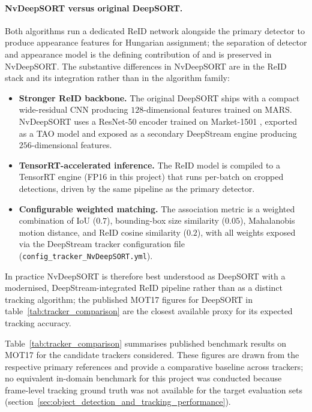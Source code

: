 \paragraph{NvDeepSORT versus original DeepSORT.}
Both algorithms run a dedicated ReID network alongside the primary detector to
produce appearance features for Hungarian assignment; the separation of
detector and appearance model is the defining contribution of
\citet{wojke2017simple} and is preserved in NvDeepSORT. The substantive
differences in NvDeepSORT are in the ReID stack and its integration rather than
in the algorithm family:

\begin{itemize}
	\item \textbf{Stronger ReID backbone.} The original DeepSORT ships with a
	      compact wide-residual CNN producing $128$-dimensional features trained on
	      MARS. NvDeepSORT uses a ResNet-50 encoder trained on Market-1501
	      \citep{nvidia2026reidnet}, exported as a TAO model and exposed as a
	      secondary DeepStream engine producing $256$-dimensional features.
	\item \textbf{TensorRT-accelerated inference.} The ReID model is compiled to
	      a TensorRT engine (FP16 in this project) that runs per-batch on cropped
	      detections, driven by the same pipeline as the primary detector.
	\item \textbf{Configurable weighted matching.} The association metric is a
	      weighted combination of IoU ($0.7$), bounding-box size similarity
	      ($0.05$), Mahalanobis motion distance, and ReID cosine similarity
	      ($0.2$), with all weights exposed via the DeepStream tracker
	      configuration file (\texttt{config\_tracker\_NvDeepSORT.yml}).
\end{itemize}

In practice NvDeepSORT is therefore best understood as DeepSORT with a
modernised, DeepStream-integrated ReID pipeline rather than as a distinct
tracking algorithm; the published MOT17 figures for DeepSORT in
table~\ref{tab:tracker_comparison} are the closest available proxy for its
expected tracking accuracy.

Table~\ref{tab:tracker_comparison} summarises published benchmark results on
MOT17 for the candidate trackers considered. These figures are drawn from the
respective primary references and provide a comparative baseline across
trackers; no equivalent in-domain benchmark for this project was conducted
because frame-level tracking ground truth was not available for the target
evaluation sets (section~\ref{sec:object_detection_and_tracking_performance}).

